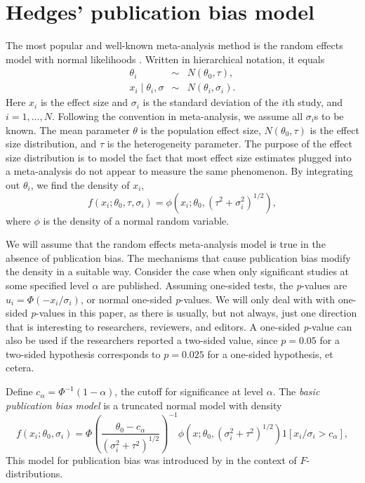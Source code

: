 \documentclass[article]{ajs}
\numberwithin{equation}{section}
\numberwithin{figure}{section}
\theoremstyle{plain}
\theoremstyle{definition}
\theoremstyle{definition}
\theoremstyle{plain}
\renewcommand{\sqrt}[1]{{(#1)^{1/2}}}
\begin{document}
\section{Hedges' publication bias model}

The most popular and well-known meta-analysis method is the random
effects model with normal likelihoods \citep{hedges1998fixed}. Written
in hierarchical notation, it equals
\begin{eqnarray*}
\theta_{i} & \sim & N(\theta_{0},\tau),\\
x_{i}\mid\theta_{i},\sigma & \sim & N(\theta_{i},\sigma_{i}).
\end{eqnarray*}
Here $x_{i}$ is the effect size and $\sigma_{i}$ is the standard
deviation of the $i$th study, and $i=1,\ldots,N$. Following the
convention in meta-analysis, we assume all $\sigma_{i}$s to be known.
The mean parameter $\theta$ is the population effect size, $N(\theta_{0},\tau)$
is the effect size distribution, and $\tau$ is the heterogeneity
parameter. The purpose of the effect size distribution is to model
the fact that most effect size estimates plugged into a meta-analysis
do not appear to measure the same phenomenon. By integrating out $\theta_{i}$,
we find the density of $x_{i}$,
\[
f(x_{i};\theta_{0},\tau,\sigma_{i})=\phi(x_{i};\theta_{0},\sqrt{\tau^{2}+\sigma_{i}^{2}}),
\]
where $\phi$ is the density of a normal random variable. 

We will assume that the random effects meta-analysis model is true
in the absence of publication bias. The mechanisms that cause publication
bias modify the density in a suitable way. Consider the case when
only significant studies at some specified level $\alpha$ are published.
Assuming one-sided tests, the \emph{p}-values are $u_{i}=\Phi(-x_{i}/\sigma_{i})$,
or normal one-sided \emph{p}-values. We will only deal with with one-sided
\emph{p}-values in this paper, as there is usually, but not always,
just one direction that is interesting to researchers, reviewers,
and editors. A one-sided \emph{p}-value can also be used if the researchers
reported a two-sided value, since $p=0.05$ for a two-sided hypothesis
corresponds to $p=0.025$ for a one-sided hypothesis, et cetera.

Define $c_{\alpha}=\Phi^{-1}(1-\alpha)$, the cutoff for significance
at level $\alpha$. The \emph{basic publication bias model} is a truncated
normal model with density
\begin{equation}
f(x_{i};\theta_{0},\sigma_{i})=\Phi\left(\frac{\theta_{0}-c_{\alpha}}{\sqrt{\sigma_{i}^{2}+\tau^{2}}}\right)^{-1}\phi(x;\theta_{0},\sqrt{\sigma_{i}^{2}+\tau^{2}})1[x_{i}/\sigma_{i}>c_{\alpha}],\label{eq:selection for significance model}
\end{equation}
This model for publication bias was introduced by \citet{hedges1984estimation}
in the context of $F$-distributions.
\end{document}
